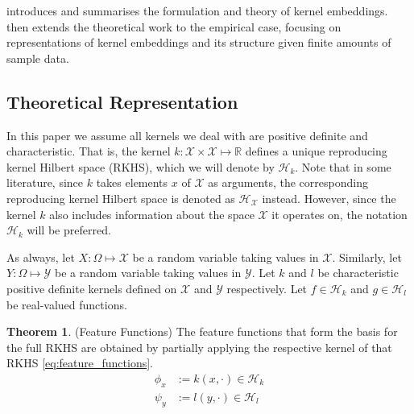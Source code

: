 \documentclass[twoside]{article} \usepackage{aistats2017}
\theoremstyle{definition}
\newtheorem{theorem}{Theorem}[section]
\newcommand{\rv}[1]{{#1}}
\newcommand{\Hk}{\mathcal{H}_{k}}
\newcommand{\Hl}{\mathcal{H}_{l}}
\begin{document}
	 introduces and summarises the formulation and theory of kernel embeddings.  then extends the theoretical work to the empirical case, focusing on representations of kernel embeddings and its structure given finite amounts of sample data.
	
	\subsection{Theoretical Representation}
	\label{sec:kernel_embeddings:theoretical_representation}
	
		In this paper we assume all kernels we deal with are positive definite and characteristic. That is, the kernel $k : \mathcal{X} \times \mathcal{X} \mapsto \mathbb{R}$ defines a unique reproducing kernel Hilbert space (RKHS), which we will denote by $\mathcal{H}_{k}$. Note that in some literature, since $k$ takes elements $x$ of $\mathcal{X}$ as arguments, the corresponding reproducing kernel Hilbert space is denoted as $\mathcal{H}_{\mathcal{X}}$ instead. However, since the kernel $k$ also includes information about the space $\mathcal{X}$ it operates on, the notation $\mathcal{H}_{k}$ will be preferred.
		
		As always, let $\rv{X} : \Omega \mapsto \mathcal{X}$ be a random variable taking values in $\mathcal{X}$. Similarly, let $\rv{Y} : \Omega \mapsto \mathcal{Y}$ be a random variable taking values in $\mathcal{Y}$. Let $k$ and $l$ be characteristic positive definite kernels defined on $\mathcal{X}$ and $\mathcal{Y}$ respectively. Let $f \in \Hk$ and $g \in \Hl$ be real-valued functions.
			
		\begin{theorem} \label{thm:feature_functions}
			(Feature Functions)
			The feature functions that form the basis for the full RKHS are obtained by partially applying the respective kernel of that RKHS \eqref{eq:feature_functions}.
			\begin{equation}
			\begin{aligned}
				\phi_{x} &:= k(x, \cdot) \in \Hk \\
				\psi_{y} &:= l(y, \cdot) \in \Hl
			\label{eq:feature_functions}
			\end{aligned}
			\end{equation}
		\end{theorem}
	
\end{document}
